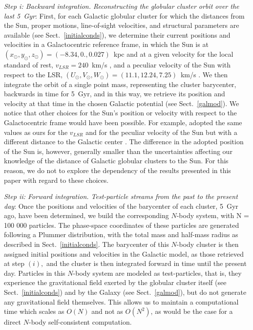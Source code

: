         \textit{Step i: Backward integration. Reconstructing the globular cluster orbit over the last 5~Gyr}: First, for each Galactic globular cluster for which the distances from the Sun, proper motions, line-of-sight velocities, and structural parameters are  available (see Sect.~\ref{initialconds}), we determine their current positions and velocities in a Galactocentric reference frame, in which the Sun is at $(x_\odot, y_\odot, z_\odot) = (-8.34, 0., 0.027)$~kpc \citep{2001ApJ...553..184C, 2014ApJ...783..130R} and at a given velocity for the local standard of rest, $v_{LSR}= 240$~km/s \citep{2014ApJ...783..130R}, and a peculiar velocity of the Sun with respect to the LSR, $(U_{\odot}, V_{\odot}, W_{\odot})  = (11.1, 12.24, 7.25)$~km/s \citep{2010MNRAS.403.1829S}. We then integrate the orbit of a single point mass, representing the cluster barycenter, backwards in time for 5~Gyr, and in this way, we retrieve its position and velocity at that time in the chosen Galactic potential (see Sect.~\ref{galmod}). We notice that other choices for the Sun's position or velocity with respect to the Galactocentric frame would have been possible. For example, \citet{2021MNRAS.505.3033P} adopted the same values as ours for the $v_{LSR}$ and for the peculiar velocity of the Sun but with a different distance to the Galactic center \citep[8.1~kpc in their work, see][]{2018A&A...615L..15G}. The difference in the adopted position of the Sun is, however, generally smaller than the uncertainties affecting our knowledge of the distance of Galactic globular clusters to the Sun. For this reason, we do not to explore the dependency of the results presented in this paper with regard to these choices. 

        \textit{Step ii: Forward integration. Test-particle streams from the past to the present day}: Once the positions and velocities of the barycenter of each cluster, 5~Gyr ago, have been determined, we build  the corresponding $N$-body system, with N = 100 000 particles.  The phase-space coordinates of these particles are generated following a Plummer distribution, with the total mass and half-mass radius as described in Sect.~\ref{initialconds}. The barycenter of this $N$-body cluster is then assigned initial positions and velocities in the Galactic model, as those retrieved at step $(i),$ and the cluster is then integrated forward in time until the present day. Particles in this $N$-body system are modeled as test-particles, that is, they experience the gravitational field exerted by the globular cluster itself (see Sect.~\ref{initialconds}) and by the Galaxy (see Sect.~\ref{galmod}), but do not generate any gravitational field themselves. This allows us to maintain a computational time which scales as $O(N)$ and not as $O(N^2)$, as would be the case for a direct $N$-body self-consistent computation.

